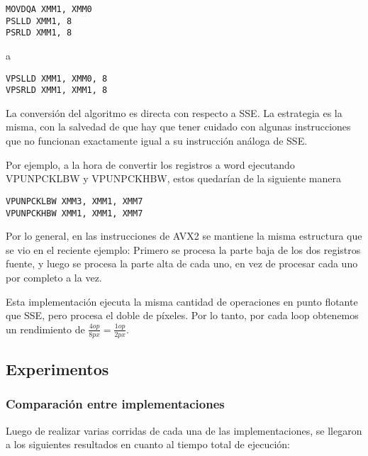 \begin{lstlisting}
MOVDQA XMM1, XMM0
PSLLD XMM1, 8
PSRLD XMM1, 8
\end{lstlisting}

a

\begin{lstlisting}
VPSLLD XMM1, XMM0, 8
VPSRLD XMM1, XMM1, 8
\end{lstlisting}


La conversión del algoritmo es directa con respecto a SSE. La estrategia es la misma, con la salvedad de que hay que tener cuidado con algunas instrucciones que no funcionan exactamente igual a su instrucción análoga de SSE.

Por ejemplo, a la hora de convertir los registros a word ejecutando VPUNPCKLBW y VPUNPCKHBW, estos quedarían de la siguiente manera

\begin{lstlisting}
VPUNPCKLBW XMM3, XMM1, XMM7
VPUNPCKHBW XMM1, XMM1, XMM7
\end{lstlisting}

 

 

Por lo general, en las instrucciones de AVX2 se mantiene la misma estructura que se vio en el reciente ejemplo: Primero se procesa la parte baja de los dos registros fuente, y luego se procesa la parte alta de cada uno, en vez de procesar cada uno por completo a la vez.

Esta implementación ejecuta la misma cantidad de operaciones en punto flotante que SSE, pero procesa el doble de píxeles. Por lo tanto, por cada loop obtenemos un rendimiento de $\frac{4op}{8px} = \frac{1op}{2px}$.


\subsection{Experimentos}

\subsubsection{Comparación entre implementaciones}

 Luego de realizar varias corridas de cada una de las implementaciones, se llegaron a los siguientes resultados en cuanto al tiempo total de ejecución:

